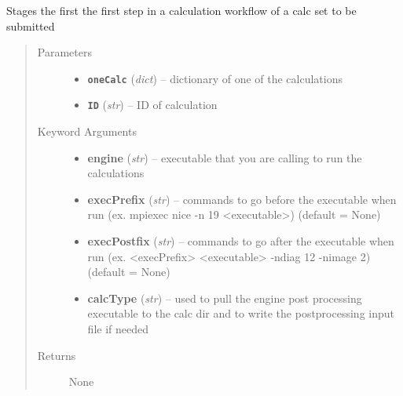 \documentclass[letterpaper,10pt,english]{sphinxmanual}
\begin{document}
\begin{fulllineitems}
\label{run:run.__testOne}
Stages the first the first step in a calculation workflow of a calc set to be submitted
\begin{quote}\begin{description}
\item[{Parameters}] \leavevmode\begin{itemize}
\item {} 
\textbf{\texttt{oneCalc}} (\emph{dict}) -- dictionary of one of the calculations

\item {} 
\textbf{\texttt{ID}} (\emph{str}) -- ID of calculation

\end{itemize}

\item[{Keyword Arguments}] \leavevmode\begin{itemize}
\item {} 
\textbf{engine} (\emph{str}) --
executable that you are calling to run the calculations

\item {} 
\textbf{execPrefix} (\emph{str}) --
commands to go before the executable when run
(ex. mpiexec nice -n 19 \textless{}executable\textgreater{}) (default = None)

\item {} 
\textbf{execPostfix} (\emph{str}) --
commands to go after the executable when run
(ex. \textless{}execPrefix\textgreater{} \textless{}executable\textgreater{} -ndiag 12 -nimage 2) (default = None)

\item {} 
\textbf{calcType} (\emph{str}) --
used to pull the engine post processing executable to the calc dir
and to write the postprocessing input file if needed

\end{itemize}

\item[{Returns}] \leavevmode
None

\end{description}\end{quote}

\end{fulllineitems}

\end{document}
